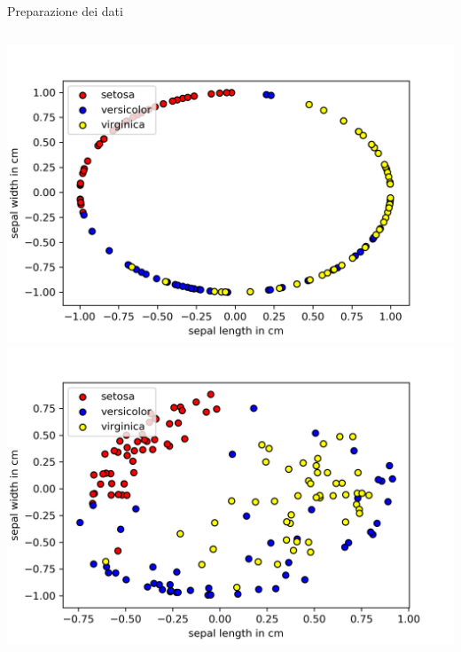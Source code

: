\documentclass{beamer}
\begin{document}
\begin{frame}{Preparazione dei dati}
        \begin{columns}
            \includegraphics[width=\columnwidth]{gfx/iris/irisnormalized}
            \includegraphics[width=\columnwidth]{gfx/iris/iris4normalized}
        \end{columns}
    \end{frame}
\end{document}
